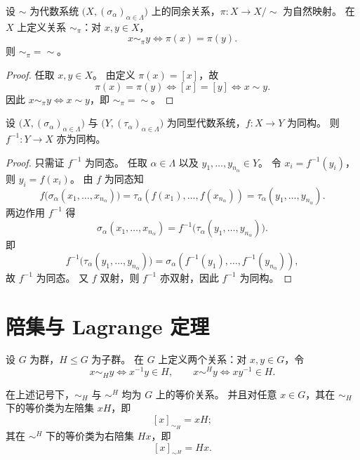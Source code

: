 \documentclass[lang=cn,a4paper,newtx]{elegantbook}
\begin{document}
\begin{proposition}
设 $\sim$ 为代数系统 $\bigl(X,(\sigma_{\alpha})_{\alpha\in\Lambda}\bigr)$ 上的同余关系，$\pi:X\to X/\!\sim$ 为自然映射。
在 $X$ 上定义关系 $\sim_{\pi}$：对 $x,y\in X$，
\[
  x\sim_{\pi} y\iff \pi(x)=\pi(y).
\]
则 $\sim_{\pi}=\sim$。
\end{proposition}

\begin{proof}
任取 $x,y\in X$。
由定义 $\pi(x)=[x]$，故
\[
  \pi(x)=\pi(y)\iff [x]=[y]\iff x\sim y.
\]
因此 $x\sim_{\pi} y\iff x\sim y$，即 $\sim_{\pi}=\sim$。
\end{proof}

\begin{proposition}
设 $\bigl(X,(\sigma_{\alpha})_{\alpha\in\Lambda}\bigr)$ 与 $\bigl(Y,(\tau_{\alpha})_{\alpha\in\Lambda}\bigr)$ 为同型代数系统，$f:X\to Y$ 为同构。
则 $f^{-1}:Y\to X$ 亦为同构。
\end{proposition}

\begin{proof}
只需证 $f^{-1}$ 为同态。
任取 $\alpha\in\Lambda$ 以及 $y_1,\dots,y_{n_{\alpha}}\in Y$。
令 $x_i=f^{-1}(y_i)$，则 $y_i=f(x_i)$。
由 $f$ 为同态知
\[
  f\bigl(\sigma_{\alpha}(x_1,\dots,x_{n_{\alpha}})\bigr)=\tau_{\alpha}(f(x_1),\dots,f(x_{n_{\alpha}}))=\tau_{\alpha}(y_1,\dots,y_{n_{\alpha}}).
\]
两边作用 $f^{-1}$ 得
\[
  \sigma_{\alpha}(x_1,\dots,x_{n_{\alpha}})=f^{-1}\bigl(\tau_{\alpha}(y_1,\dots,y_{n_{\alpha}})\bigr).
\]
即
\[
  f^{-1}\bigl(\tau_{\alpha}(y_1,\dots,y_{n_{\alpha}})\bigr)=\sigma_{\alpha}(f^{-1}(y_1),\dots,f^{-1}(y_{n_{\alpha}})),
\]
故 $f^{-1}$ 为同态。
又 $f$ 双射，则 $f^{-1}$ 亦双射，因此 $f^{-1}$ 为同构。
\end{proof}

\section{陪集与 Lagrange 定理}

\begin{definition}
设 $G$ 为群，$H\le G$ 为子群。
在 $G$ 上定义两个关系：对 $x,y\in G$，令
\[
  x\sim_H y\iff x^{-1}y\in H,\qquad x\sim^{H} y\iff xy^{-1}\in H.
\]
\end{definition}

\begin{proposition}\label{coset-equiv-class}
在上述记号下，$\sim_H$ 与 $\sim^{H}$ 均为 $G$ 上的等价关系。
并且对任意 $x\in G$，其在 $\sim_H$ 下的等价类为左陪集 $xH$，即
\[
  [x]_{\sim_H}=xH;
\]
其在 $\sim^{H}$ 下的等价类为右陪集 $Hx$，即
\[
  [x]_{\sim^{H}}=Hx.
\]
\end{proposition}
\end{document}
